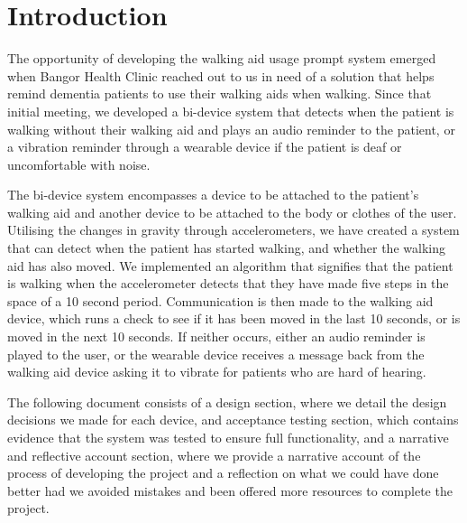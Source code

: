 \chapter{Introduction}

The opportunity of developing the walking aid usage prompt system emerged when Bangor Health Clinic reached out to us in need of a solution that helps remind dementia patients to use their walking aids when walking. Since that initial meeting, we developed a bi-device system that detects when the patient is walking without their walking aid and plays an audio reminder to the patient, or a vibration reminder through a wearable device if the patient is deaf or uncomfortable with noise. 

The bi-device system encompasses a device to be attached to the patient's walking aid and another device to be attached to the body or clothes of the user. Utilising the changes in gravity through accelerometers, we have created a system that can detect when the patient has started walking, and whether the walking aid has also moved. We implemented an algorithm that signifies that the patient is walking when the accelerometer detects that they have made five steps in the space of a 10 second period. Communication is then made to the walking aid device, which runs a check to see if it has been moved in the last 10 seconds, or is moved in the next 10 seconds. If neither occurs, either an audio reminder is played to the user, or the wearable device receives a message back from the walking aid device asking it to vibrate for patients who are hard of hearing. 

The following document consists of a design section, where we detail the design decisions we made for each device, and acceptance testing section, which contains evidence that the system was tested to ensure full functionality, and a narrative and reflective account section, where we provide a narrative account of the process of developing the project and a reflection on what we could have done better had we avoided mistakes and been offered more resources to complete the project.
